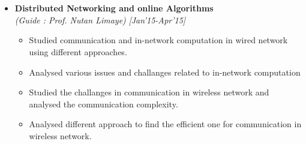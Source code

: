 \\[-.7cm]\\
\begin{itemize}
\item \textbf{Distributed Networking and online Algorithms}  \\
      \emph{(Guide : Prof. Nutan Limaye)} \hfill {\emph{[Jan'15-Apr'15]}} \\[-0.5cm]
      \begin{itemize}
	    \item Studied communication and in-network computation in wired network using different approaches.\\[-0.4cm]
	    \item Analysed various issues and challanges related to in-network computation\\[-0.4cm]
	    \item Studied the challanges in communication in wireless network and analysed the communication complexity.\\[-0.4cm]
	    \item Analysed different approach to find the efficient one for communication in wireless network.\\[-0.4cm]
      \end{itemize}
\end{itemize}
